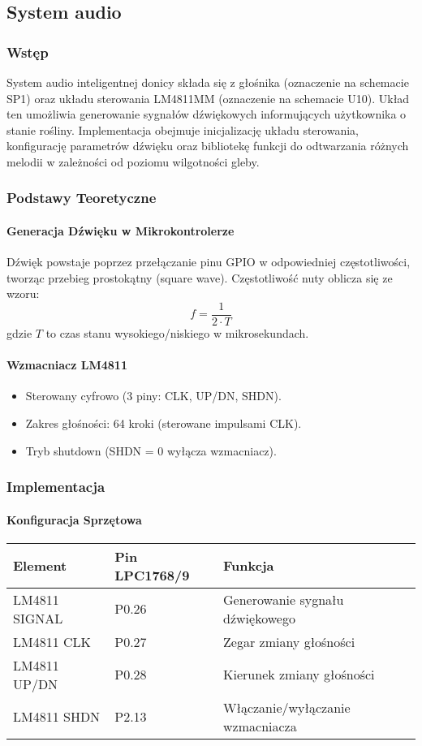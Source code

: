 \subsection{System audio}

\subsubsection{Wstęp}
System audio inteligentnej donicy składa się z głośnika (oznaczenie na schemacie SP1) oraz układu sterowania LM4811MM (oznaczenie na schemacie U10). Układ ten umożliwia generowanie sygnałów dźwiękowych informujących użytkownika o stanie rośliny. Implementacja obejmuje inicjalizację układu sterowania, konfigurację parametrów dźwięku oraz bibliotekę funkcji do odtwarzania różnych melodii w zależności od poziomu wilgotności gleby.


\subsubsection{Podstawy Teoretyczne}
\paragraph{Generacja Dźwięku w Mikrokontrolerze}
Dźwięk powstaje poprzez przełączanie pinu GPIO w odpowiedniej częstotliwości, tworząc przebieg prostokątny (square wave).
Częstotliwość nuty oblicza się ze wzoru:
$$ f = \frac{1}{2 \cdot T} $$
gdzie $T$ to czas stanu wysokiego/niskiego w mikrosekundach.

\paragraph{Wzmacniacz LM4811}
\begin{itemize}
    \item Sterowany cyfrowo (3 piny: CLK, UP/DN, SHDN).
    \item Zakres głośności: 64 kroki (sterowane impulsami CLK).
    \item Tryb shutdown (SHDN = 0 wyłącza wzmacniacz).
\end{itemize}

\subsubsection{Implementacja}
\paragraph{Konfiguracja Sprzętowa}
\begin{tabular}{|l|l|l|}
\hline
\textbf{Element} & \textbf{Pin LPC1768/9} & \textbf{Funkcja} \\
\hline
LM4811 SIGNAL& P0.26 & Generowanie sygnału dźwiękowego \\
LM4811 CLK & P0.27 & Zegar zmiany głośności \\
LM4811 UP/DN & P0.28 & Kierunek zmiany głośności \\
LM4811 SHDN & P2.13 & Włączanie/wyłączanie wzmacniacza \\
\hline
\end{tabular}

